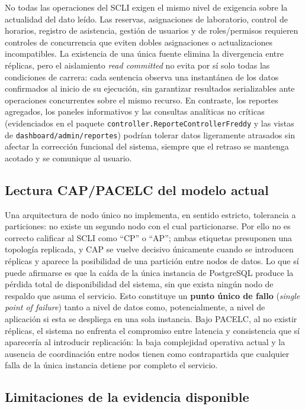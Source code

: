 \documentclass[conference]{IEEEtran}
\begin{document}
No todas las operaciones del SCLI exigen el mismo nivel de exigencia sobre la actualidad del dato le\'ido. Las reservas, asignaciones de laboratorio, control de horarios, registro de asistencia, gesti\'on de usuarios y de roles/permisos requieren controles de concurrencia que eviten dobles asignaciones o actualizaciones incompatibles. La existencia de una \'unica fuente elimina la divergencia entre r\'eplicas, pero el aislamiento \emph{read committed} no evita por s\'i solo todas las condiciones de carrera: cada sentencia observa una instant\'anea de los datos confirmados al inicio de su ejecuci\'on, sin garantizar resultados serializables ante operaciones concurrentes sobre el mismo recurso. En contraste, los reportes agregados, los paneles informativos y las consultas anal\'iticas no cr\'iticas (evidenciados en el paquete \texttt{controller.ReporteControllerFreddy} y las vistas de \texttt{dashboard/admin/reportes}) podr\'ian tolerar datos ligeramente atrasados sin afectar la correcci\'on funcional del sistema, siempre que el retraso se mantenga acotado y se comunique al usuario.

\subsection{Lectura CAP/PACELC del modelo actual}

Una arquitectura de nodo \'unico no implementa, en sentido estricto, tolerancia a particiones: no existe un segundo nodo con el cual particionarse. Por ello no es correcto calificar al SCLI como ``CP'' o ``AP''; ambas etiquetas presuponen una topolog\'ia replicada, y CAP se vuelve decisivo \'unicamente cuando se introducen r\'eplicas y aparece la posibilidad de una partici\'on entre nodos de datos. Lo que s\'i puede afirmarse es que la ca\'ida de la \'unica instancia de PostgreSQL produce la p\'erdida total de disponibilidad del sistema, sin que exista ning\'un nodo de respaldo que asuma el servicio. Esto constituye un \textbf{punto \'unico de fallo} (\emph{single point of failure}) tanto a nivel de datos como, potencialmente, a nivel de aplicaci\'on si esta se despliega en una sola instancia. Bajo PACELC, al no existir r\'eplicas, el sistema no enfrenta el compromiso entre latencia y consistencia que s\'i aparecer\'ia al introducir replicaci\'on: la baja complejidad operativa actual y la ausencia de coordinaci\'on entre nodos tienen como contrapartida que cualquier falla de la \'unica instancia detiene por completo el servicio.

\subsection{Limitaciones de la evidencia disponible}
\end{document}
